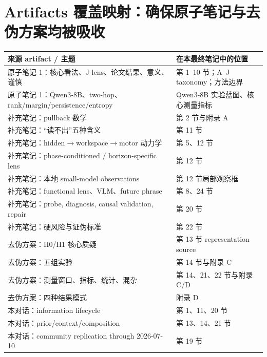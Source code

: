 \documentclass[10.5pt,a4paper]{ctexart}
\begin{document}
\section{Artifacts 覆盖映射：确保原子笔记与去伪方案均被吸收}
\begin{longtable}{p{}p{}}
\toprule
来源 artifact / 主题 & 在本最终笔记中的位置 \\
\midrule
原子笔记 1：核心看法、J-lens、论文结果、意义、谨慎 & 第 1--10 节；A--J taxonomy；方法边界 \\
原子笔记 1：Qwen3-8B、two-hop、rank/margin/persistence/entropy & Qwen3-8B 实验蓝图、核心测量指标 \\
补充笔记：pullback 数学 & 第 2 节与附录 A \\
补充笔记：“读不出”五种含义 & 第 11 节 \\
补充笔记：hidden$\to$workspace$\to$motor 动力学 & 第 5、12 节 \\
补充笔记：phase-conditioned / horizon-specific lens & 第 12 节 \\
补充笔记：本地 small-model observations & 第 12 节局部观察框 \\
补充笔记：functional lens、VLM、future phrase & 第 8、24 节 \\
补充笔记：probe, diagnosis, causal validation, repair & 第 20 节 \\
补充笔记：硬风险与证伪标准 & 第 22 节 \\
去伪方案：H0/H1 核心质疑 & 第 13 节 representation source \\
去伪方案：五组实验 & 第 14 节与附录 C \\
去伪方案：测量窗口、指标、统计、混杂 & 第 14、21、22 节与附录 C/D \\
去伪方案：四种结果模式 & 附录 D \\
本对话：information lifecycle & 第 1、11、20 节 \\
本对话：prior/context/composition & 第 13、14、21 节 \\
本对话：community replication through 2026-07-10 & 第 19 节 \\
\bottomrule
\end{longtable}
\end{document}
